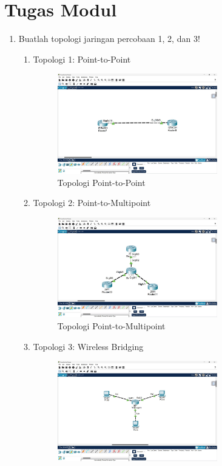 \section*{Tugas Modul} %
\begin{enumerate}
  \item Buatlah topologi jaringan percobaan 1, 2, dan 3!
      \begin{enumerate}
          \item Topologi 1: Point-to-Point
          \begin{figure}[htb]
            \centering
            \includegraphics[width=0.7\textwidth]{img/point-point.jpeg}
            \caption{Topologi Point-to-Point}
            \label{fig:topo1}
          \end{figure}
          \item Topologi 2: Point-to-Multipoint
          \begin{figure}[htb]
            \centering
            \includegraphics[width=0.7\textwidth]{img/point-multipoint.jpeg}
            \caption{Topologi Point-to-Multipoint}
            \label{fig:topo2}
          \end{figure}
          \item Topologi 3: Wireless Bridging
          \begin{figure}[htb]
            \centering
            \includegraphics[width=0.7\textwidth]{img/wireless-bridging.jpeg}

\end{figure}
\end{enumerate}
\end{enumerate}
